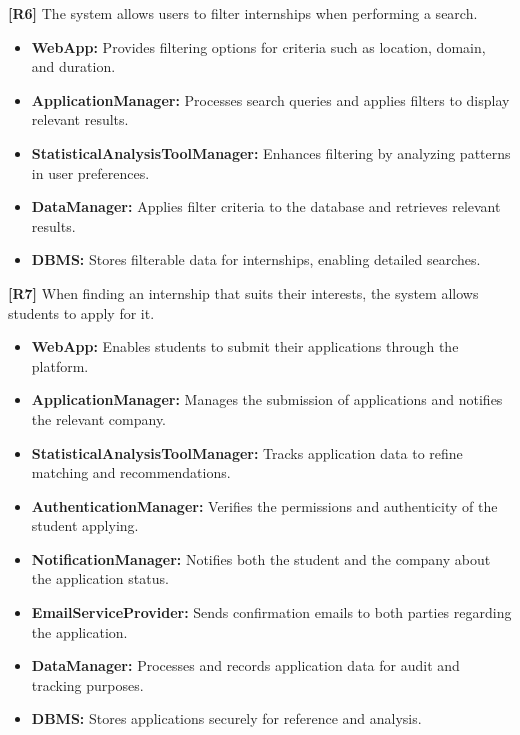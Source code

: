 \textbf{[R6]} The system allows users to filter internships when performing a search.  
\begin{itemize}
    \item \textbf{WebApp:} Provides filtering options for criteria such as location, domain, and duration.
    \item \textbf{ApplicationManager:} Processes search queries and applies filters to display relevant results.
    \item \textbf{StatisticalAnalysisToolManager:} Enhances filtering by analyzing patterns in user preferences.
    \item \textbf{DataManager:} Applies filter criteria to the database and retrieves relevant results.
    \item \textbf{DBMS:} Stores filterable data for internships, enabling detailed searches.
\end{itemize}

\textbf{[R7]} When finding an internship that suits their interests, the system allows students to apply for it.  
\begin{itemize}
    \item \textbf{WebApp:} Enables students to submit their applications through the platform.
    \item \textbf{ApplicationManager:} Manages the submission of applications and notifies the relevant company.
    \item \textbf{StatisticalAnalysisToolManager:} Tracks application data to refine matching and recommendations.
    \item \textbf{AuthenticationManager:} Verifies the permissions and authenticity of the student applying.
    \item \textbf{NotificationManager:} Notifies both the student and the company about the application status.
    \item \textbf{EmailServiceProvider:} Sends confirmation emails to both parties regarding the application.
    \item \textbf{DataManager:} Processes and records application data for audit and tracking purposes.
    \item \textbf{DBMS:} Stores applications securely for reference and analysis.
\end{itemize}

